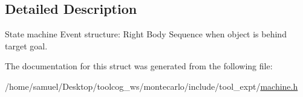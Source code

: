 \subsection{Detailed Description}
State machine Event structure\+: Right Body Sequence when object is behind target goal. 

The documentation for this struct was generated from the following file\+:\begin{DoxyCompactItemize}
\item 
/home/samuel/\+Desktop/toolcog\+\_\+ws/montecarlo/include/tool\+\_\+expt/\hyperlink{machine_8h}{machine.\+h}\end{DoxyCompactItemize}
